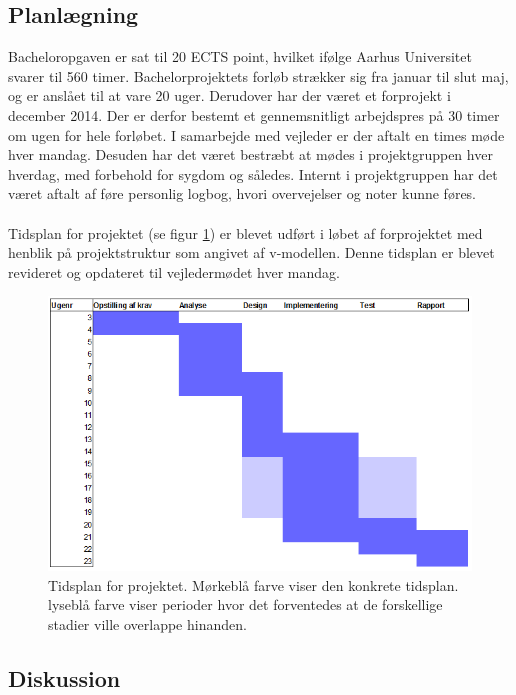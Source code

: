\documentclass[rapport.tex]{subfiles}
\begin{document}
	\subsection{Planlægning}
	Bacheloropgaven er sat til 20 ECTS point, hvilket ifølge Aarhus Universitet svarer til 560 timer. Bachelorprojektets forløb strækker sig fra januar til slut maj, og er anslået til at vare 20 uger. Derudover har der været et forprojekt i december 2014. Der er derfor bestemt et gennemsnitligt arbejdspres på 30 timer om ugen for hele forløbet. I samarbejde med vejleder er der aftalt en times møde hver mandag. Desuden har det været bestræbt at mødes i projektgruppen hver hverdag, med forbehold for sygdom og således. Internt i projektgruppen har det været aftalt af føre personlig logbog, hvori overvejelser og noter kunne føres. \\
	\\
	Tidsplan for projektet (se figur \ref{fig:Tidsplan}) er blevet udført i løbet af forprojektet med henblik på projektstruktur som angivet af v-modellen. Denne tidsplan er blevet revideret og opdateret til vejledermødet hver mandag. 
	
	\begin{figure}
	\centering
	\includegraphics[width=1\linewidth]{Tidsplan}
	\caption[Tidsplan for projektet]{Tidsplan for projektet. Mørkeblå farve viser den konkrete tidsplan. lyseblå farve viser perioder hvor det forventedes at de forskellige stadier ville overlappe hinanden.}
	\label{fig:Tidsplan}
	\end{figure}
	
	\subsection{Diskussion}
	
		
\end{document}
